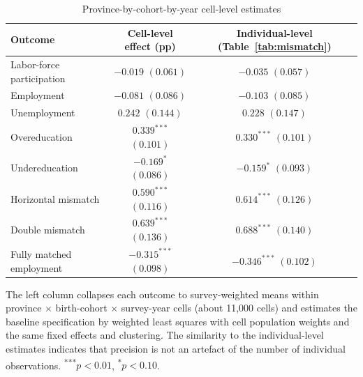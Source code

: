 \begin{table}[htbp]
  \centering
  \caption{Province-by-cohort-by-year cell-level estimates}
  \label{tab:appcell}
  \begin{threeparttable}
  \begin{tabular}{L{5.6cm}cc}
    \toprule
    Outcome & Cell-level effect (pp) & Individual-level (Table~\ref{tab:mismatch}) \\
    \midrule
    Labor-force participation & $-0.019$ $(0.061)$ & $-0.035$ $(0.057)$ \\
    Employment                & $-0.081$ $(0.086)$ & $-0.103$ $(0.085)$ \\
    Unemployment              & $0.242$ $(0.144)$  & $0.228$ $(0.147)$ \\
    Overeducation             & $0.339^{***}$ $(0.101)$ & $0.330^{***}$ $(0.101)$ \\
    Undereducation            & $-0.169^{*}$ $(0.086)$  & $-0.159^{*}$ $(0.093)$ \\
    Horizontal mismatch       & $0.590^{***}$ $(0.116)$ & $0.614^{***}$ $(0.126)$ \\
    Double mismatch           & $0.639^{***}$ $(0.136)$ & $0.688^{***}$ $(0.140)$ \\
    Fully matched employment  & $-0.315^{***}$ $(0.098)$ & $-0.346^{***}$ $(0.102)$ \\
    \bottomrule
  \end{tabular}
  \begin{tablenotes}[flushleft]
    \footnotesize
    \item The left column collapses each outcome to survey-weighted means within
    province $\times$ birth-cohort $\times$ survey-year cells (about 11{,}000 cells) and estimates
    the baseline specification by weighted least squares with cell population weights and the same
    fixed effects and clustering. The similarity to the individual-level estimates indicates that
    precision is not an artefact of the number of individual observations.
    \textsuperscript{***}$p<0.01$, \textsuperscript{*}$p<0.10$.
  \end{tablenotes}
  \end{threeparttable}
\end{table}

